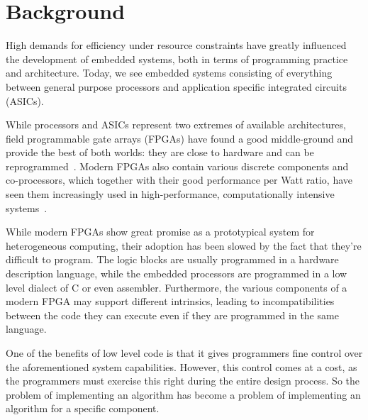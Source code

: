 \documentclass[../main.tex]{subfiles}
\begin{document}
\chapter{Background}
\label{background}

High demands for efficiency under resource constraints have greatly influenced the development of embedded systems, both in terms of programming practice and architecture. Today, we see embedded systems consisting of everything between general purpose processors and application specific integrated circuits (ASICs).


While processors and ASICs represent two extremes of available architectures, field programmable gate arrays (FPGAs) have found a good middle-ground and provide the best of both worlds: they are close to hardware and can be reprogrammed~\cite{bacon2013}. Modern FPGAs also contain various discrete components and co-processors, which together with their good performance per Watt ratio, have seen them increasingly used in high-performance, computationally intensive systems~\cite{mcmillan2014}.


While modern FPGAs show great promise as a prototypical system for heterogeneous computing, their adoption has been slowed by the fact that they're difficult to program. The logic blocks are usually programmed in a hardware description language, while the embedded processors are programmed in a low level dialect of C or even assembler. Furthermore, the various components of a modern FPGA may support different intrinsics, leading to incompatibilities between the code they can execute even if they are programmed in the same language.


One of the benefits of low level code is that it gives programmers fine control over the aforementioned system capabilities. However, this control comes at a cost, as the programmers must exercise this right during the entire design process. So the problem of implementing an algorithm has become a problem of implementing an algorithm for a specific component.
\end{document}
